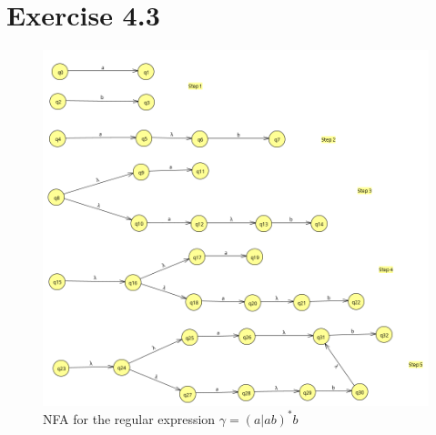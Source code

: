 \documentclass{article} %
\newcommand{\homeworkNumber}{4}
\begin{document}
\section*{Exercise \homeworkNumber.3}
\begin{figure}[H]
		\includegraphics[width=\linewidth]{ex4.png}
		\centering
		\caption{NFA for the regular expression $\gamma = (a|ab)^*b$}
\end{figure}

\clearpage
\end{document}

